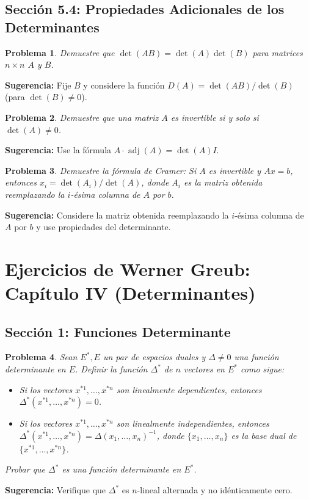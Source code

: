 \documentclass[12pt,a4paper]{article}
\newtheorem{problem}{Problema}
\newenvironment{suggestion}{\par\noindent\textbf{Sugerencia: }}{}
\begin{document}
\subsection{Sección 5.4: Propiedades Adicionales de los Determinantes}

\begin{problem}
Demuestre que $\det(AB)=\det(A)\det(B)$ para matrices $n\times n$ $A$ y $B$.
\end{problem}
\begin{suggestion}
Fije $B$ y considere la función $D(A)=\det(AB)/\det(B)$ (para $\det(B)\neq 0$).
\end{suggestion}

\begin{problem}
Demuestre que una matriz $A$ es invertible si y solo si $\det(A)\neq 0$.
\end{problem}
\begin{suggestion}
Use la fórmula $A\cdot\operatorname{adj}(A)=\det(A)I$.
\end{suggestion}

\begin{problem}
Demuestre la fórmula de Cramer: Si $A$ es invertible y $Ax=b$, entonces $x_i=\det(A_i)/\det(A)$, donde $A_i$ es la matriz obtenida reemplazando la $i$-ésima columna de $A$ por $b$.
\end{problem}
\begin{suggestion}
Considere la matriz obtenida reemplazando la $i$-ésima columna de $A$ por $b$ y use propiedades del determinante.
\end{suggestion}

\section{Ejercicios de Werner Greub: Capítulo IV (Determinantes)}

\subsection{Sección 1: Funciones Determinante}

\begin{problem}
Sean $E^*, E$ un par de espacios duales y $\Delta\neq 0$ una función determinante en $E$. Definir la función $\Delta^*$ de $n$ vectores en $E^*$ como sigue:
\begin{itemize}
\item Si los vectores $x^{*1},\dots,x^{*n}$ son linealmente dependientes, entonces $\Delta^*(x^{*1},\dots,x^{*n})=0$.
\item Si los vectores $x^{*1},\dots,x^{*n}$ son linealmente independientes, entonces $\Delta^*(x^{*1},\dots,x^{*n})=\Delta(x_1,\dots,x_n)^{-1}$, donde $\{x_1,\dots,x_n\}$ es la base dual de $\{x^{*1},\dots,x^{*n}\}$.
\end{itemize}
Probar que $\Delta^*$ es una función determinante en $E^*$.
\end{problem}
\begin{suggestion}
Verifique que $\Delta^*$ es $n$-lineal alternada y no idénticamente cero.
\end{suggestion}
\end{document}
